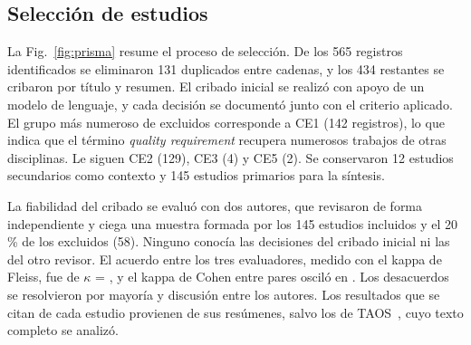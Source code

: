 \subsection{Selección de estudios}
La Fig.~\ref{fig:prisma} resume el proceso de selección. De los 565 registros identificados se eliminaron 131 duplicados entre cadenas, y los 434 restantes se cribaron por título y resumen. El cribado inicial se realizó con apoyo de un modelo de lenguaje, y cada decisión se documentó junto con el criterio aplicado. El grupo más numeroso de excluidos corresponde a CE1 (142 registros), lo que indica que el término \emph{quality requirement} recupera numerosos trabajos de otras disciplinas. Le siguen CE2 (129), CE3 (4) y CE5 (2). Se conservaron 12 estudios secundarios como contexto y 145 estudios primarios para la síntesis.

La fiabilidad del cribado se evaluó con dos autores, que revisaron de forma independiente y ciega una muestra formada por los 145 estudios incluidos y el 20\,\% de los excluidos (58). Ninguno conocía las decisiones del cribado inicial ni las del otro revisor. El acuerdo entre los tres evaluadores, medido con el kappa de Fleiss, fue de $\kappa$ = \kappaFleiss, y el kappa de Cohen entre pares osciló en \kappaCohen. Los desacuerdos se resolvieron por mayoría y discusión entre los autores. Los resultados que se citan de cada estudio provienen de sus resúmenes, salvo los de TAOS~\cite{BenAmmar2025-TAOS}, cuyo texto completo se analizó.


